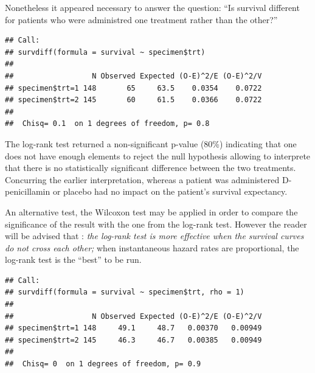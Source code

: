 \documentclass[]{article}
\newenvironment{Shaded}{\begin{snugshade}}{\end{snugshade}}
\newcommand{\KeywordTok}[1]{\textcolor[rgb]{0.13,0.29,0.53}{\textbf{#1}}}
\newcommand{\DataTypeTok}[1]{\textcolor[rgb]{0.13,0.29,0.53}{#1}}
\newcommand{\DecValTok}[1]{\textcolor[rgb]{0.00,0.00,0.81}{#1}}
\newcommand{\StringTok}[1]{\textcolor[rgb]{0.31,0.60,0.02}{#1}}
\newcommand{\OperatorTok}[1]{\textcolor[rgb]{0.81,0.36,0.00}{\textbf{#1}}}
\newcommand{\NormalTok}[1]{#1}
\begin{document}
Nonetheless it appeared necessary to answer the question: ``Is survival
different for patients who were administred one treatment rather than
the other?''

\begin{Shaded}
\end{Shaded}

\begin{verbatim}
## Call:
## survdiff(formula = survival ~ specimen$trt)
## 
##                  N Observed Expected (O-E)^2/E (O-E)^2/V
## specimen$trt=1 148       65     63.5    0.0354    0.0722
## specimen$trt=2 145       60     61.5    0.0366    0.0722
## 
##  Chisq= 0.1  on 1 degrees of freedom, p= 0.8
\end{verbatim}

The log-rank test returned a non-significant p-value (80\%) indicating
that one does not have enough elements to reject the null hypothesis
allowing to interprete that there is no statistically significant
difference between the two treatments. Concurring the earlier
interpretation, whereas a patient was administered D-penicillamin or
placebo had no impact on the patient's survival expectancy.

An alternative test, the Wilcoxon test may be applied in order to
compare the significance of the result with the one from the log-rank
test. However the reader will be advised that : \emph{the log-rank test
is more effective when the survival curves do not cross each other;
}when instantaneous hazard rates are proportional, the log-rank test is
the ``best'' to be run.

\begin{Shaded}
\end{Shaded}

\begin{verbatim}
## Call:
## survdiff(formula = survival ~ specimen$trt, rho = 1)
## 
##                  N Observed Expected (O-E)^2/E (O-E)^2/V
## specimen$trt=1 148     49.1     48.7   0.00370   0.00949
## specimen$trt=2 145     46.3     46.7   0.00385   0.00949
## 
##  Chisq= 0  on 1 degrees of freedom, p= 0.9
\end{verbatim}
\end{document}
